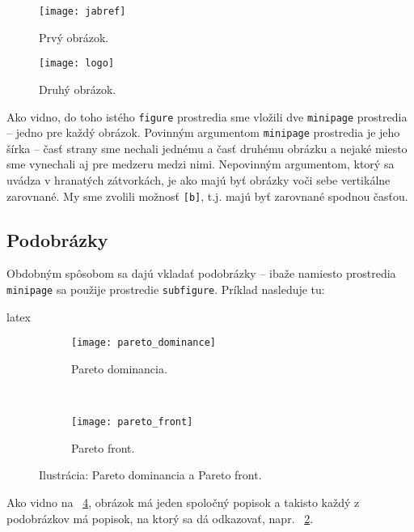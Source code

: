 \begin{figure}
\centering
\begin{minipage}[b]{0.58\textwidth}
\centering
\texttt{[image: jabref]}
\caption{Prvý obrázok.}
\label{fig:mini1}
\end{minipage}\quad
\begin{minipage}[b]{0.38\textwidth}
\centering
\texttt{[image: logo]}
\caption{Druhý obrázok.}
\label{fig:mini2}
\end{minipage}
\end{figure}

Ako vidno, do toho istého \texttt{figure} prostredia sme vložili dve \texttt{minipage} prostredia -- jedno pre každý obrázok. Povinným argumentom \texttt{minipage} prostredia je jeho šírka -- časť strany sme nechali jednému a časť druhému obrázku a nejaké miesto sme vynechali aj pre medzeru medzi nimi. Nepovinným argumentom, ktorý sa uvádza v hranatých zátvorkách, je ako majú byť obrázky voči sebe vertikálne zarovnané. My sme zvolili možnosť \texttt{[b]}, t.j. majú byť zarovnané spodnou časťou.

\subsection{Podobrázky}

Obdobným spôsobom sa dajú vkladať podobrázky -- ibaže namiesto prostredia \texttt{minipage} sa použije prostredie \texttt{subfigure}. Príklad nasleduje tu:
\begin{inlinecode}{latex}
\begin{figure}
\centering
\begin{subfigure}[c]{0.5\textwidth}
	\centering
	\texttt{[image: pareto\_dominance]}
	\caption{Pareto dominancia.}
	\label{fig:subfig1}
\end{subfigure}~
\begin{subfigure}[c]{0.5\textwidth}
	\centering
	\texttt{[image: pareto\_front]}
	\caption{Pareto front.}
	\label{fig:subfig2}
\end{subfigure}
\caption{Ilustrácia: Pareto dominancia a Pareto front.}
\label{fig:fig_with_subfigs}
\end{figure}
\end{inlinecode}

Ako vidno na \figurename~\ref{fig:fig_with_subfigs}, obrázok má jeden spoločný popisok a takisto každý z podobrázkov má popisok, na ktorý sa dá odkazovať, napr. \figurename~\ref{fig:subfig1}.

